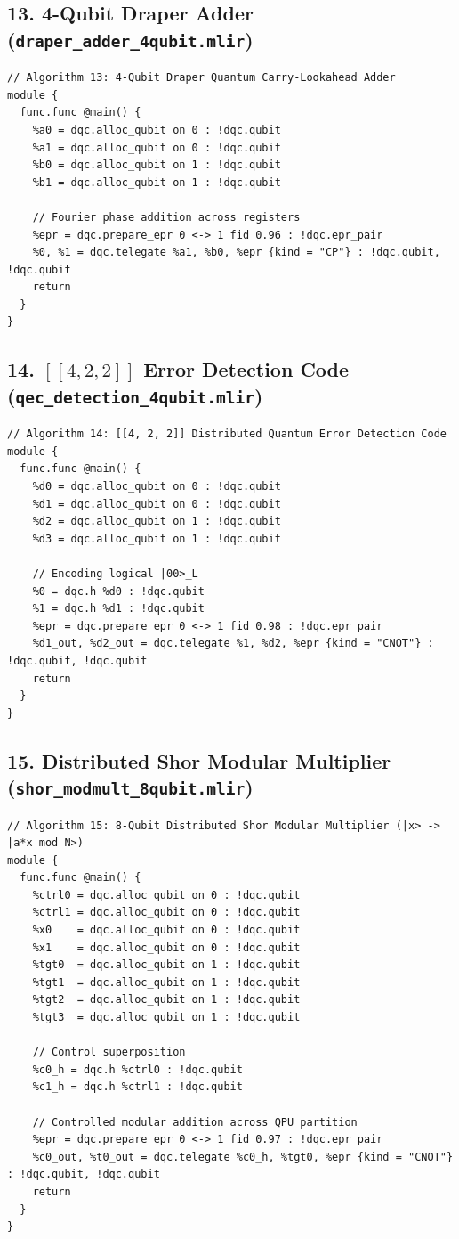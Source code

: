 \subsection{13. 4-Qubit Draper Adder (\texttt{draper\_adder\_4qubit.mlir})}
\begin{lstlisting}[language=MLIR, caption={draper\_adder\_4qubit.mlir}]
// Algorithm 13: 4-Qubit Draper Quantum Carry-Lookahead Adder
module {
  func.func @main() {
    %a0 = dqc.alloc_qubit on 0 : !dqc.qubit
    %a1 = dqc.alloc_qubit on 0 : !dqc.qubit
    %b0 = dqc.alloc_qubit on 1 : !dqc.qubit
    %b1 = dqc.alloc_qubit on 1 : !dqc.qubit

    // Fourier phase addition across registers
    %epr = dqc.prepare_epr 0 <-> 1 fid 0.96 : !dqc.epr_pair
    %0, %1 = dqc.telegate %a1, %b0, %epr {kind = "CP"} : !dqc.qubit, !dqc.qubit
    return
  }
}
\end{lstlisting}

\subsection{14. $[[4, 2, 2]]$ Error Detection Code (\texttt{qec\_detection\_4qubit.mlir})}
\begin{lstlisting}[language=MLIR, caption={qec\_detection\_4qubit.mlir}]
// Algorithm 14: [[4, 2, 2]] Distributed Quantum Error Detection Code
module {
  func.func @main() {
    %d0 = dqc.alloc_qubit on 0 : !dqc.qubit
    %d1 = dqc.alloc_qubit on 0 : !dqc.qubit
    %d2 = dqc.alloc_qubit on 1 : !dqc.qubit
    %d3 = dqc.alloc_qubit on 1 : !dqc.qubit

    // Encoding logical |00>_L
    %0 = dqc.h %d0 : !dqc.qubit
    %1 = dqc.h %d1 : !dqc.qubit
    %epr = dqc.prepare_epr 0 <-> 1 fid 0.98 : !dqc.epr_pair
    %d1_out, %d2_out = dqc.telegate %1, %d2, %epr {kind = "CNOT"} : !dqc.qubit, !dqc.qubit
    return
  }
}
\end{lstlisting}

\subsection{15. Distributed Shor Modular Multiplier (\texttt{shor\_modmult\_8qubit.mlir})}
\begin{lstlisting}[language=MLIR, caption={shor\_modmult\_8qubit.mlir}]
// Algorithm 15: 8-Qubit Distributed Shor Modular Multiplier (|x> -> |a*x mod N>)
module {
  func.func @main() {
    %ctrl0 = dqc.alloc_qubit on 0 : !dqc.qubit
    %ctrl1 = dqc.alloc_qubit on 0 : !dqc.qubit
    %x0    = dqc.alloc_qubit on 0 : !dqc.qubit
    %x1    = dqc.alloc_qubit on 0 : !dqc.qubit
    %tgt0  = dqc.alloc_qubit on 1 : !dqc.qubit
    %tgt1  = dqc.alloc_qubit on 1 : !dqc.qubit
    %tgt2  = dqc.alloc_qubit on 1 : !dqc.qubit
    %tgt3  = dqc.alloc_qubit on 1 : !dqc.qubit

    // Control superposition
    %c0_h = dqc.h %ctrl0 : !dqc.qubit
    %c1_h = dqc.h %ctrl1 : !dqc.qubit

    // Controlled modular addition across QPU partition
    %epr = dqc.prepare_epr 0 <-> 1 fid 0.97 : !dqc.epr_pair
    %c0_out, %t0_out = dqc.telegate %c0_h, %tgt0, %epr {kind = "CNOT"} : !dqc.qubit, !dqc.qubit
    return
  }
}
\end{lstlisting}

